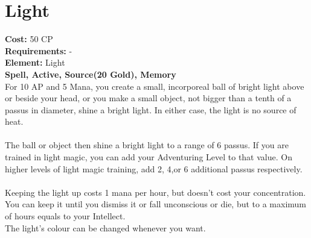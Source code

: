 \section{Light}
\textbf{Cost:} 50 CP\\
\textbf{Requirements:} -\\
\textbf{Element:} Light\\
\textbf{Spell, Active, Source(20 Gold), Memory}\\
For 10 AP and 5 Mana, you create a small, incorporeal ball of bright light above or beside your head, or you make a small object, not bigger than a tenth of a passus in diameter, shine a bright light. In either case, the light is no source of heat.\\
\\
The ball or object then shine a bright light to a range of 6 passus. If you are trained in light magic, you can add your Adventuring Level to that value. On higher levels of light magic training, add 2, 4,or 6 additional passus respectively.\\
\\
Keeping the light up costs 1 mana per hour, but doesn't cost your concentration. You can keep it until you dismiss it or fall unconscious or die, but to a maximum of hours equals to your Intellect.
\\
The light's colour can be changed whenever you want.\\